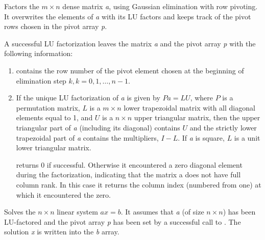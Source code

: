 \documentclass[letterpaper,10pt,english]{sphinxmanual}
\begin{document}

\begin{fulllineitems}
Factors the $m \times n$ dense matrix \emph{a}, using Gaussian
elimination with row pivoting. It overwrites the elements of \emph{a}
with its LU factors and keeps track of the pivot rows chosen in the
pivot array \emph{p}.

A successful LU factorization leaves the matrix \emph{a} and the pivot
array \emph{p} with the following information:
\begin{enumerate}
\item {} 
 contains the row number of the pivot element chosen at
the beginning of elimination step $k, k = 0, 1, \ldots,
n-1$.

\item {} 
If the unique LU factorization of \emph{a} is given by $P a =
LU$, where $P$ is a permutation matrix, $L$ is a
$m \times n$ lower trapezoidal matrix with all diagonal
elements equal to 1, and $U$ is a $n \times n$ upper
triangular matrix, then the upper triangular part of \emph{a}
(including its diagonal) contains $U$ and the strictly
lower trapezoidal part of \emph{a} contains the multipliers,
$I-L$. If \emph{a} is square, $L$ is a unit lower
triangular matrix.

{\hyperref[linear_solvers/DLS:denseGETRF]{}} returns 0 if successful. Otherwise it
encountered a zero diagonal element during the factorization,
indicating that the matrix a does not have full column rank. In
this case it returns the column index (numbered from one) at
which it encountered the zero.

\end{enumerate}

\end{fulllineitems}


\begin{fulllineitems}
\label{linear_solvers/DLS:denseGETRS}
Solves the $n \times n$ linear system $ax = b$. It
assumes that \emph{a} (of size $n \times n$) has been LU-factored
and the pivot array \emph{p} has been set by a successful call to
{\hyperref[linear_solvers/DLS:denseGETRF]{}}. The solution \emph{x} is written into the \emph{b}
array.

\end{fulllineitems}
\end{document}
